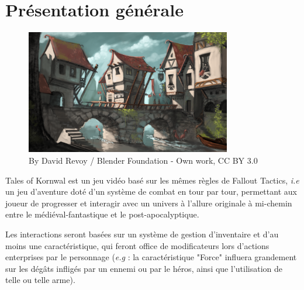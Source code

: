\documentclass[12pt,a4paper]{report}
\begin{document}
    \section{Présentation générale}
    \begin{figure}[htp]
    \includegraphics[width=0.80\textwidth]{bridge.png}
    \hfill
  \caption {\tiny By David Revoy / Blender Foundation - Own work, CC BY 3.0}
\end{figure}
    Tales of Kornwal est un jeu vidéo basé sur les mêmes règles de Fallout Tactics, \textit{i.e}  un jeu d'aventure doté d'un système de combat en tour par tour, permettant aux joueur de progresser et interagir avec un univers à l'allure originale à mi-chemin entre le médiéval-fantastique et le post-apocalyptique.
    
    Les interactions seront basées sur un système de gestion d'inventaire et d'au moins une caractéristique, qui feront office de modificateurs lors d'actions enterprises par le personnage (\textit{e.g} : la caractéristique "Force" influera grandement sur les dégâts infligés par un ennemi ou par le héros, ainsi que l'utilisation de telle ou telle arme).
    
\end{document}
